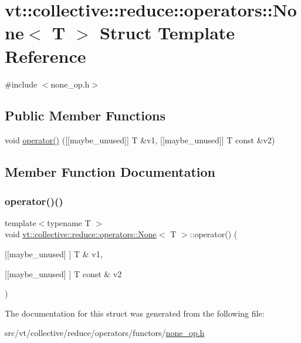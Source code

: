 \hypertarget{structvt_1_1collective_1_1reduce_1_1operators_1_1_none}{}\section{vt\+:\+:collective\+:\+:reduce\+:\+:operators\+:\+:None$<$ T $>$ Struct Template Reference}
\label{structvt_1_1collective_1_1reduce_1_1operators_1_1_none}


{\ttfamily \#include $<$none\+\_\+op.\+h$>$}

\subsection*{Public Member Functions}
\begin{DoxyCompactItemize}
\item 
void \hyperlink{structvt_1_1collective_1_1reduce_1_1operators_1_1_none_a62f165047ef49b64e60660bfc04a0640}{operator()} (\mbox{[}\mbox{[}maybe\+\_\+unused\mbox{]}\mbox{]} T \&v1, \mbox{[}\mbox{[}maybe\+\_\+unused\mbox{]}\mbox{]} T const \&v2)
\end{DoxyCompactItemize}


\subsection{Member Function Documentation}
\mbox{\label{structvt_1_1collective_1_1reduce_1_1operators_1_1_none_a62f165047ef49b64e60660bfc04a0640}} 
\subsubsection{\texorpdfstring{operator()()}{operator()()}}
{\footnotesize\ttfamily template$<$typename T $>$ \\
void \hyperlink{structvt_1_1collective_1_1reduce_1_1operators_1_1_none}{vt\+::collective\+::reduce\+::operators\+::\+None}$<$ T $>$\+::operator() (\begin{DoxyParamCaption}\item[{\mbox{[}\mbox{[}maybe\+\_\+unused\mbox{]} \mbox{]} T \&}]{v1,  }\item[{\mbox{[}\mbox{[}maybe\+\_\+unused\mbox{]} \mbox{]} T const \&}]{v2 }\end{DoxyParamCaption})\hspace{0.3cm}{\ttfamily [inline]}}



The documentation for this struct was generated from the following file\+:\begin{DoxyCompactItemize}
\item 
src/vt/collective/reduce/operators/functors/\hyperlink{none__op_8h}{none\+\_\+op.\+h}\end{DoxyCompactItemize}

